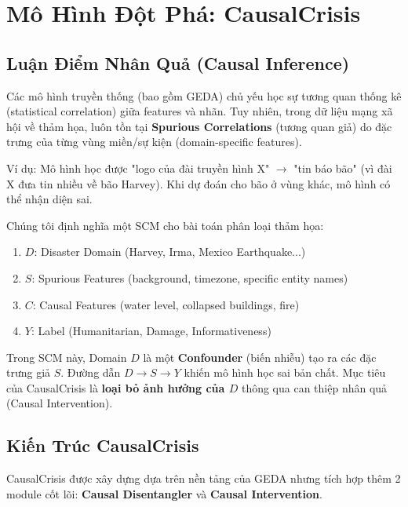 \documentclass[12pt,a4paper]{article}
\begin{document}
\section{Mô Hình Đột Phá: CausalCrisis}

\subsection{Luận Điểm Nhân Quả (Causal Inference)}

Các mô hình truyền thống (bao gồm GEDA) chủ yếu học sự tương quan thống kê (statistical correlation) giữa features và nhãn. Tuy nhiên, trong dữ liệu mạng xã hội về thảm họa, luôn tồn tại \textbf{Spurious Correlations} (tương quan giả) do đặc trưng của từng vùng miền/sự kiện (domain-specific features). 

Ví dụ: Mô hình học được "logo của đài truyền hình X" $\rightarrow$ "tin báo bão" (vì đài X đưa tin nhiều về bão Harvey). Khi dự đoán cho bão ở vùng khác, mô hình có thể nhận diện sai.

\begin{insightbox}
Chúng tôi định nghĩa một SCM cho bài toán phân loại thảm họa:
\begin{enumerate}[leftmargin=*]
    \item $D$: Disaster Domain (Harvey, Irma, Mexico Earthquake...)
    \item $S$: Spurious Features (background, timezone, specific entity names)
    \item $C$: Causal Features (water level, collapsed buildings, fire)
    \item $Y$: Label (Humanitarian, Damage, Informativeness)
\end{enumerate}
Trong SCM này, Domain $D$ là một \textbf{Confounder} (biến nhiễu) tạo ra các đặc trưng giả $S$. Đường dẫn $D \rightarrow S \rightarrow Y$ khiến mô hình học sai bản chất. Mục tiêu của CausalCrisis là \textbf{loại bỏ ảnh hưởng của $D$} thông qua can thiệp nhân quả (Causal Intervention).
\end{insightbox}

\subsection{Kiến Trúc CausalCrisis}

CausalCrisis được xây dựng dựa trên nền tảng của GEDA nhưng tích hợp thêm 2 module cốt lõi: \textbf{Causal Disentangler} và \textbf{Causal Intervention}.
\end{document}
